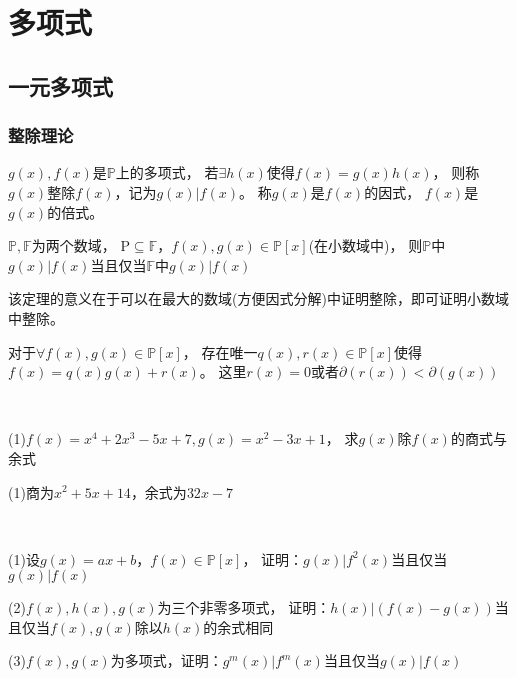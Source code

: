 


\chapter{多项式}

\section{一元多项式}

\subsection{整除理论}

\begin{definition}[整除]
  $g(x),f(x)$是$\mathbb{P}$上的多项式，
  若$\exists h(x)$使得$f(x) = g(x)h(x)$，
  则称$g(x)$整除$f(x)$，记为$g(x)|f(x)$。
  称$g(x)$是$f(x)$的因式，
  $f(x)$是$g(x)$的倍式。
\end{definition}

\begin{theorem}[整除的数域不变性]
  $\mathbb{P},\mathbb{F}$为两个数域，
  $\mathrm{P} \subseteq \mathbb{F}$，$f(x), g(x) \in \mathbb{P}[x]$(在小数域中)，
  则$\mathbb{P}$中$g(x)|f(x)$当且仅当$\mathbb{F}$中$g(x)|f(x)$
\end{theorem}

\begin{note}
  该定理的意义在于可以在最大的数域(方便因式分解)中证明整除，即可证明小数域中整除。
\end{note}

\begin{theorem}[带余除法]
  对于$\forall f(x),g(x) \in \mathbb{P}[x]$，
  存在唯一$q(x),r(x) \in \mathbb{P}[x]$使得$f(x) = q(x)g(x) + r(x)$。
  这里$r(x) = 0$或者$\partial (r(x)) < \partial(g(x))$
\end{theorem}

~

\begin{exercise}[带余除法的计算]
  (1)$f(x) = x^4 + 2x^3 - 5x + 7, g(x) = x^2 - 3x + 1$，
  求$g(x)$除$f(x)$的商式与余式
\end{exercise}

\begin{solution}
  (1)商为$x^2 + 5x + 14$，余式为$32x - 7$
\end{solution}

~

\begin{exercise}[带余除法的应用]
  (1)设$g(x) = ax + b$，$f(x) \in \mathbb{P}[x]$，
  证明：$g(x) | f^2(x)$当且仅当$g(x) | f(x)$

  (2)$f(x),h(x),g(x)$为三个非零多项式，
  证明：$h(x)|(f(x) - g(x))$当且仅当$f(x),g(x)$除以$h(x)$的余式相同

  (3)$f(x),g(x)$为多项式，证明：$g^m(x)|f^m(x)$当且仅当$g(x)|f(x)$
\end{exercise}

